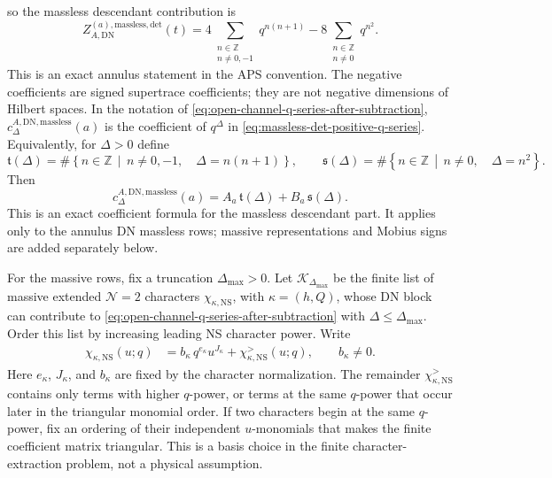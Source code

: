\documentclass[11pt]{article}
\newcommand{\Z}{\mathbb{Z}}
\newcommand{\NS}{\mathrm{NS}}
\newcommand{\DN}{\mathrm{DN}}
\begin{document}
so the massless descendant contribution is
\begin{equation}
  Z_{A,\DN}^{(a),\mathrm{massless,det}}(t)
  =
  4\!\!\sum_{\substack{n\in\Z\\ n\ne0,-1}}\!\!q^{n(n+1)}
  -
  8\!\!\sum_{\substack{n\in\Z\\ n\ne0}}\!\!q^{n^2}.
  \label{eq:symmetric-massless-det-positive-q-series}
\end{equation}
This is an exact annulus statement in the APS convention. The negative coefficients are signed
supertrace coefficients; they are not negative dimensions of Hilbert spaces.
In the notation of \eqref{eq:open-channel-q-series-after-subtraction},
\(c_\Delta^{A,\DN,\mathrm{massless}}(a)\) is the coefficient of \(q^\Delta\) in
\eqref{eq:massless-det-positive-q-series}.
Equivalently, for \(\Delta>0\) define
\begin{equation}
  \mathfrak t(\Delta)
  =
  \#\left\{n\in\Z\,\middle|\,
    n\ne0,-1,\quad \Delta=n(n+1)
  \right\},
  \qquad
  \mathfrak s(\Delta)
  =
  \#\left\{n\in\Z\,\middle|\,
    n\ne0,\quad \Delta=n^2
  \right\}.
  \label{eq:massless-descendant-counting-functions}
\end{equation}
Then
\begin{equation}
  c_\Delta^{A,\DN,\mathrm{massless}}(a)
  =
  A_a\,\mathfrak t(\Delta)
  +
  B_a\,\mathfrak s(\Delta).
  \label{eq:massless-DN-annulus-coefficient-closed-form}
\end{equation}
This is an exact coefficient formula for the massless descendant part. It applies only to the
annulus DN massless rows; massive representations and Mobius signs are added separately below.

For the massive rows, fix a truncation \(\Delta_{\max}>0\). Let
\(\mathcal K_{\Delta_{\max}}\) be the finite list of massive extended
\(\mathcal N=2\) characters \(\chi_{\kappa,\NS}\), with
\(\kappa=(h,Q)\), whose DN block can contribute to
\eqref{eq:open-channel-q-series-after-subtraction} with
\(\Delta\le\Delta_{\max}\). Order this list by increasing leading NS character power. Write
\begin{align}
  \chi_{\kappa,\NS}(u;q)
  &=
  b_\kappa\,q^{e_\kappa}u^{J_\kappa}
  +
  \chi_{\kappa,\NS}^{>}(u;q),
  \qquad b_\kappa\ne0.
  \label{eq:massive-character-leading-monomial}
\end{align}
Here \(e_\kappa\), \(J_\kappa\), and \(b_\kappa\) are fixed by the character normalization. The
remainder \(\chi_{\kappa,\NS}^{>}\) contains only terms with higher \(q\)-power, or terms at the
same \(q\)-power that occur later in the triangular monomial order. If two characters begin at
the same \(q\)-power, fix an ordering of their
independent \(u\)-monomials that makes the finite coefficient matrix triangular. This is a basis
choice in the finite character-extraction problem, not a physical assumption.
\end{document}
